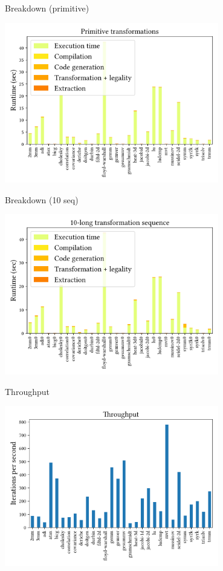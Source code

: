 \documentclass[presentation, aspectratio=169]{beamer}
\begin{document}
\begin{frame}[label={sec:org8d5974d}]{Breakdown (primitive)}
\begin{center}
\includegraphics[width=0.7\textwidth]{./figs/plot-breakdown-abs-1.pdf}
\end{center}
\end{frame}
\begin{frame}[label={sec:org89de702}]{Breakdown (10 seq)}
\begin{center}
\includegraphics[width=0.7\textwidth]{./figs/plot-breakdown-abs-10.pdf}
\end{center}
\end{frame}
\begin{frame}[label={sec:org0e2a1a3}]{Throughput}
\begin{center}
\includegraphics[width=0.7\textwidth]{./figs/plot-throughput.pdf}
\end{center}
\end{frame}
\end{document}
